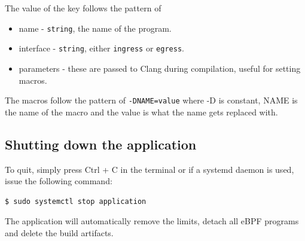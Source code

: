 \noindent
The value of the key follows the pattern of

\begin{itemize}
	\item name - \texttt{string}, the name of the program.
	\item interface - \texttt{string}, either \texttt{ingress} or \texttt{egress}.
	\item parameters - these are passed to Clang during compilation, useful for setting macros.
\end{itemize}


The macros follow the pattern of \texttt{-DNAME=value} where -D is constant, NAME is the name of the macro and the value is what the name gets replaced with.

\subsection{Shutting down the application}
To quit, simply press Ctrl + C in the terminal or if a systemd daemon is used, issue the following command:
\begin{verbatim}
$ sudo systemctl stop application
\end{verbatim}

The application will automatically remove the limits, detach all eBPF programs and delete the build artifacts.